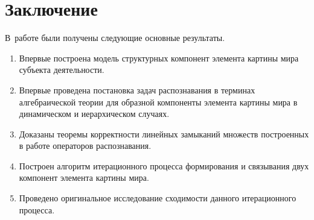 \chapter*{Заключение}						%

В~работе были получены следующие основные результаты.

\begin{enumerate}
	\renewcommand\labelenumi{\theenumi.}
	\item Впервые построена модель структурных компонент элемента картины мира субъекта деятельности.
	\item Впервые проведена постановка задач распознавания в терминах алгебраической теории для образной компоненты элемента картины мира в динамическом и иерархическом случаях.
	\item Доказаны теоремы корректности линейных замыканий множеств построенных в работе операторов распознавания.
	\item Построен алгоритм итерационного процесса формирования и связывания двух компонент элемента картины мира.
	\item Проведено оригинальное исследование сходимости данного итерационного процесса.
\end{enumerate}

\clearpage